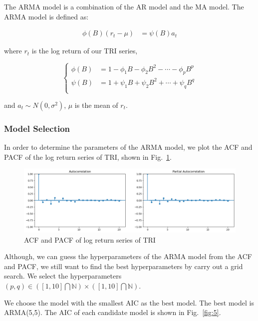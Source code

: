 \documentclass[runningheads]{llncs}
\begin{document}
The ARMA model is a combination of the AR model and the MA model. The ARMA model is defined as:

$$
    \begin{aligned}
        \phi(B)(r_t-\mu) & =\psi(B)a_t
    \end{aligned}
$$

where $r_t$ is the log return of our TRI series,

$$
    \begin{cases}
        \phi(B) & =1-\phi_1B-\phi_2B^2-\cdots-\phi_pB^p \\
        \psi(B) & =1+\psi_1B+\psi_2B^2+\cdots+\psi_qB^q \\
    \end{cases}
$$

and $a_t\sim N(0,\sigma^2)$, $\mu$ is the mean of $r_t$.

\subsubsection{Model Selection}

In order to determine the parameters of the ARMA model,
we plot the ACF and PACF of the log return series of TRI, shown in Fig.~\ref{fig:4}.


\begin{figure}[htbp]
    \centering
    \includegraphics[width=\textwidth]{../img/acfs.png}
    \caption{ACF and PACF of log return series of TRI}
    \label{fig:4}
\end{figure}

Although, we can guess the hyperparameters of the ARMA model from the ACF and PACF,
we still want to find the best hyperparameters by carry out a grid search. We select the hyperparameters $(p,q) \in ([1,10]\bigcap \mathbb{N})\times ([1,10]\bigcap \mathbb{N})$.

We choose the model with the smallest AIC as the best model. The best model is ARMA(5,5).
The AIC of each candidate model is shown in Fig.~\ref{fig:5}.

\end{document}
